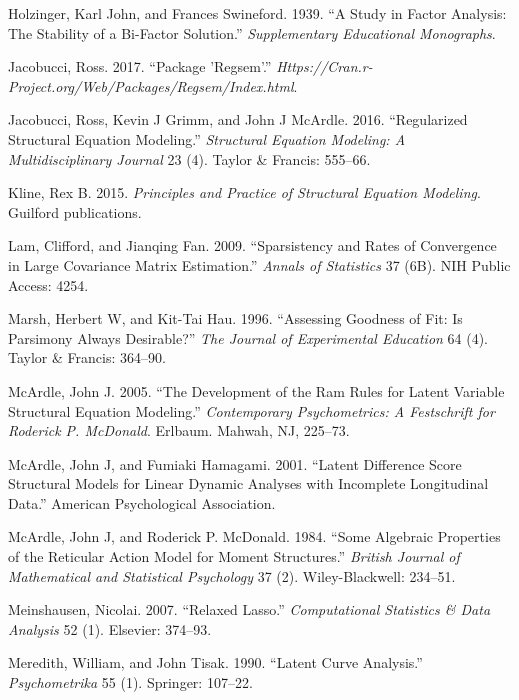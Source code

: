 \hypertarget{ref-holzinger1939study}{}
Holzinger, Karl John, and Frances Swineford. 1939. ``A Study in Factor
Analysis: The Stability of a Bi-Factor Solution.'' \emph{Supplementary
Educational Monographs}.

\hypertarget{ref-jacobucci2016package}{}
Jacobucci, Ross. 2017. ``Package 'Regsem'.''
\emph{Https://Cran.r-Project.org/Web/Packages/Regsem/Index.html}.

\hypertarget{ref-jacobucci2016regularized}{}
Jacobucci, Ross, Kevin J Grimm, and John J McArdle. 2016. ``Regularized
Structural Equation Modeling.'' \emph{Structural Equation Modeling: A
Multidisciplinary Journal} 23 (4). Taylor \& Francis: 555--66.

\hypertarget{ref-kline2015principles}{}
Kline, Rex B. 2015. \emph{Principles and Practice of Structural Equation
Modeling}. Guilford publications.

\hypertarget{ref-lam2009sparsistency}{}
Lam, Clifford, and Jianqing Fan. 2009. ``Sparsistency and Rates of
Convergence in Large Covariance Matrix Estimation.'' \emph{Annals of
Statistics} 37 (6B). NIH Public Access: 4254.

\hypertarget{ref-marsh1996assessing}{}
Marsh, Herbert W, and Kit-Tai Hau. 1996. ``Assessing Goodness of Fit: Is
Parsimony Always Desirable?'' \emph{The Journal of Experimental
Education} 64 (4). Taylor \& Francis: 364--90.

\hypertarget{ref-mcardle2005}{}
McArdle, John J. 2005. ``The Development of the Ram Rules for Latent
Variable Structural Equation Modeling.'' \emph{Contemporary
Psychometrics: A Festschrift for Roderick P. McDonald}. Erlbaum. Mahwah,
NJ, 225--73.

\hypertarget{ref-mcardle2001latent}{}
McArdle, John J, and Fumiaki Hamagami. 2001. ``Latent Difference Score
Structural Models for Linear Dynamic Analyses with Incomplete
Longitudinal Data.'' American Psychological Association.

\hypertarget{ref-McArdle_1984}{}
McArdle, John J, and Roderick P. McDonald. 1984. ``Some Algebraic
Properties of the Reticular Action Model for Moment Structures.''
\emph{British Journal of Mathematical and Statistical Psychology} 37
(2). Wiley-Blackwell: 234--51.

\hypertarget{ref-meinshausen2007relaxed}{}
Meinshausen, Nicolai. 2007. ``Relaxed Lasso.'' \emph{Computational
Statistics \& Data Analysis} 52 (1). Elsevier: 374--93.

\hypertarget{ref-meredith1990latent}{}
Meredith, William, and John Tisak. 1990. ``Latent Curve Analysis.''
\emph{Psychometrika} 55 (1). Springer: 107--22.

